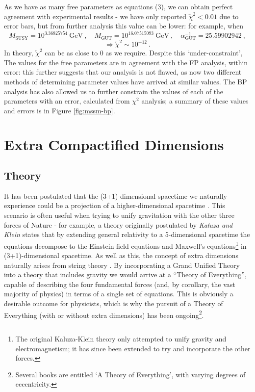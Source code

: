 \documentclass[12pt,a4paper,oneside]{article}
\begin{document}
As we have as many free parameters as equations (3), we can obtain perfect agreement with experimental results - we have only reported $\overleftarrow{\chi}^2 < 0.01$ due to error bars, but from further analysis this value can be lower: for example, when
\singlespace
\[
M_\mathrm{SUSY} = 10^{3.36825754} \:\mathrm{GeV} \:,\quad M_\mathrm{GUT} = 10^{16.07515093} \:\mathrm{GeV} \:, \quad \alpha_\mathrm{GUT}^{-1} = 25.59902942 \:,
\]
\[
\Rightarrow \overleftarrow{\chi}^2 \sim 10^{-12} \:.
\]
\doublespace
In theory, $\overleftarrow{\chi}^2$ can be as close to 0 as we require. Despite this `under-constraint', The values for the free parameters are in agreement with the FP analysis, within error: this further suggests that our analysis is not flawed, as now two different methods of determining parameter values have arrived at similar values. The BP analysis has also allowed us to further constrain the values of each of the parameters with an error, calculated from $\chi^2$ analysis; a summary of these values and errors is in Figure \ref{fig:mssm-bp}.


\section{Extra Compactified Dimensions}
\label{sec:ed}

\subsection{Theory}

It has been postulated that the (3+1)-dimensional spacetime we naturally experience could be a projection of a higher-dimensional spacetime \cite{ed-1,ed-2}. This scenario is often useful when trying to unify gravitation with the other three forces of Nature - for example, a theory originally postulated by \textit{Kaluza and Klein} \cite{kk} states that by extending general relativity to a 5-dimensional spacetime the equations decompose to the Einstein field equations and Maxwell's equations\footnote{The original Kaluza-Klein theory only attempted to unify gravity and electromagnetism; it has since been extended to try and incorporate the other forces.} in (3+1)-dimensional spacetime. As well as this, the concept of extra dimensions naturally arises from string theory \cite{string}. By incorporating a Grand Unified Theory into a theory that includes gravity we would arrive at a ``Theory of Everything'', capable of describing the four fundamental forces (and, by corollary, the vast majority of physics) in terms of a single set of equations. This is obviously a desirable outcome for physicists, which is why the pursuit of a Theory of Everything (with or without extra dimensions) has been ongoing\footnote{Several books are entitled `A Theory of Everything', with varying degrees of eccentricity.}.
\end{document}
